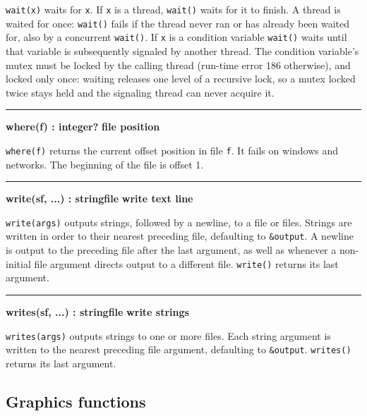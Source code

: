 \noindent
{}\texttt{wait(x)} waits for \texttt{x}. If \texttt{x} is
a thread, \texttt{wait()} waits for it to finish. A thread is waited for
once: \texttt{wait()} fails if the thread never ran or has already been
waited for, also by a concurrent \texttt{wait()}. If \texttt{x} is
a condition variable \texttt{wait()} waits until that variable is
subsequently signaled by another thread. The condition variable's mutex
must be locked by the calling thread (run-time error 186 otherwise), and
locked only once: waiting releases one level of a recursive lock, so a
mutex locked twice stays held and the signaling thread can never acquire it.

\bigskip\hrule\vspace{0.1cm}
\noindent
{\bf where(f) : integer? } \hfill {\bf file position}

\noindent
{}\texttt{where(f)} returns the
current offset position in file \texttt{f}. It fails on windows and
networks. The beginning of the file is offset 1.

\bigskip\hrule\vspace{0.1cm}
\noindent
{\bf write(s{\textbar}f, ...) : string{\textbar}file } \hfill {\bf write text line}

\noindent
\texttt{write(args)} outputs strings, followed by a newline, to a file
or files. Strings are written in order to their nearest preceding file,
defaulting to \texttt{\&output}. A newline is output to the preceding
file after the last argument, as well as whenever a non-initial file
argument directs output to a different file.
\texttt{write()} returns its last argument.

\bigskip\hrule\vspace{0.1cm}
\noindent
{\bf writes(s{\textbar}f, ...) : string{\textbar}file } \hfill {\bf write strings}

\noindent
\texttt{writes(args)} outputs strings to one or more files. Each string
argument is written to the nearest preceding file argument, defaulting
to \texttt{\&output}. \texttt{writes()} returns its
last argument.

\subsection*{Graphics functions}

